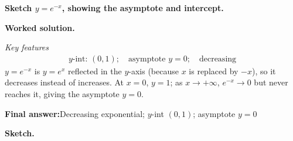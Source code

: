 \documentclass[11pt]{article}
\newcommand{\question}[1]{\par\medskip\noindent\textbf{#1}\par}
\begin{document}
\question{Sketch \( y = e^{-x} \), showing the asymptote and intercept.}

\textbf{Worked solution.}

\textit{Key features}
\[\begin{gathered}
y\text{-int: } (0,1); \quad \text{asymptote } y = 0; \quad \text{decreasing}
\end{gathered}\]
\( y = e^{-x} \) is \( y = e^x \) reflected in the \( y \)-axis (because \( x \) is replaced by \( -x \)), so it decreases instead of increases. At \( x = 0 \), \( y = 1 \); as \( x \to +\infty \), \( e^{-x} \to 0 \) but never reaches it, giving the asymptote \( y = 0 \).

\begin{answerbox}
\textbf{Final answer:}\quad Decreasing exponential; \(\displaystyle y\)-int \(\displaystyle (0,1)\); asymptote \(\displaystyle y = 0\)
\end{answerbox}
\textbf{Sketch.}
\end{document}
